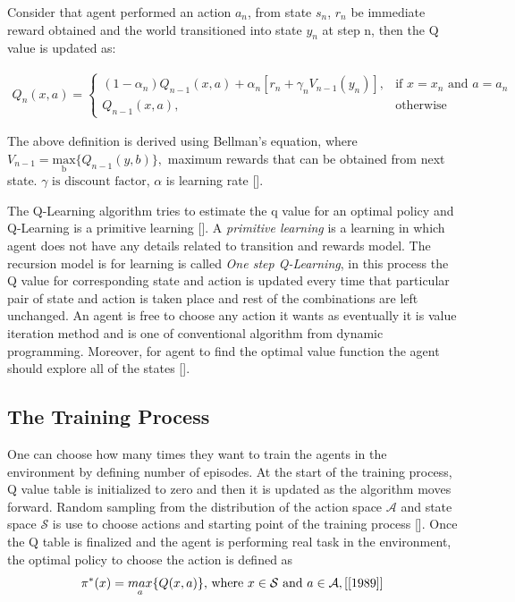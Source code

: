 \documentclass[12pt]{article}
\begin{document}
Consider that agent performed an action $a_n$, from state $s_n$, $r_n$ be immediate reward obtained and the world transitioned into state $y_n$ at step n, then the Q value is updated as:

\begin{align*}
    Q_n(x, a) = \begin{cases}
                (1 - \alpha_n) Q_{n-1}(x,a) + \alpha_n[r_n + \gamma_n V_{n-1}(y_n)], & \text{if } x = x_n \text{ and } a = a_n \\
                Q_{n-1}(x,a), & \text{otherwise}
            \end{cases}
\end{align*}

The above definition is derived using Bellman's equation, where $V_{n-1} = \underset{\text{b}}{\text{max}}\{Q_{n-1}(y,b)\},$ maximum rewards that can be obtained from next state. $\gamma \text{ is discount factor, } \alpha$  is learning rate [\cite{1992}].

The Q-Learning algorithm tries to estimate the q value for an optimal policy and Q-Learning is a primitive learning [\cite{1992}]. A \textit{primitive learning } is a learning in which agent does not have any details related to transition and rewards model. The recursion model is for learning is called \textit{One step Q-Learning}, in this process the Q value for corresponding state and action is updated every time that particular pair of state and action is taken place and rest of the combinations are left unchanged. An agent is free to choose any action it wants as eventually it is value iteration method and is one of conventional algorithm from dynamic programming. Moreover, for agent to find the optimal value function the agent should explore all of the states  [\cite{1989}].

\subsection{The Training Process}

One can choose how many times they want to train the agents in the environment by defining number of episodes. At the start of the training process, Q value table is initialized to zero and then it is updated as the algorithm moves forward. Random sampling from the distribution of the action space $\mathcal{A}$ and state space $\mathcal{S}$ is use to choose actions and starting point of the training process [\cite{Szepesvari_2022}]. Once the Q table is finalized and the agent is performing real task in the environment, the optimal policy to choose the action is defined as $$\pi^*(x) = \underset{a}{max}\{Q(x,a)\} \text{, where } x \in \mathcal{S} \text{ and } a \in \mathcal{A}, [\cite{1989}]$$ 
\end{document}
